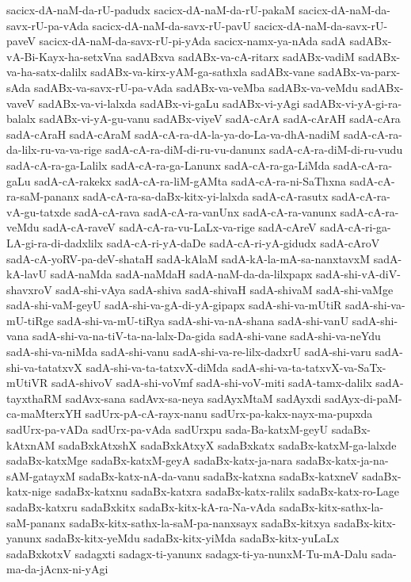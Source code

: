 {sacicx-dA-naM-da-rU-padudx
sacicx-dA-naM-da-rU-pakaM
sacicx-dA-naM-da-savx-rU-pa-vAda
sacicx-dA-naM-da-savx-rU-pavU
sacicx-dA-naM-da-savx-rU-paveV
sacicx-dA-naM-da-savx-rU-pi-yAda
sacicx-namx-ya-nAda
sadA
sadABx-vA-Bi-Kayx-ha-setxVna
sadABxva
sadABx-va-cA-ritarx
sadABx-vadiM
sadABx-va-ha-satx-dalilx
sadABx-va-kirx-yAM-ga-sathxla
sadABx-vane
sadABx-va-parx-sAda
sadABx-va-savx-rU-pa-vAda
sadABx-va-veMba
sadABx-va-veMdu
sadABx-vaveV
sadABx-va-vi-lalxda
sadABx-vi-gaLu
sadABx-vi-yAgi
sadABx-vi-yA-gi-ra-balalx
sadABx-vi-yA-gu-vanu
sadABx-viyeV
sadA-cArA
sadA-cArAH
sadA-cAra
sadA-cAraH
sadA-cAraM
sadA-cA-ra-dA-la-ya-do-La-va-dhA-nadiM
sadA-cA-ra-da-lilx-ru-va-va-rige
sadA-cA-ra-diM-di-ru-vu-danunx
sadA-cA-ra-diM-di-ru-vudu
sadA-cA-ra-ga-Lalilx
sadA-cA-ra-ga-Lanunx
sadA-cA-ra-ga-LiMda
sadA-cA-ra-gaLu
sadA-cA-rakekx
sadA-cA-ra-liM-gAMta
sadA-cA-ra-ni-SaThxna
sadA-cA-ra-saM-pananx
sadA-cA-ra-sa-daBx-kitx-yi-lalxda
sadA-cA-rasutx
sadA-cA-ra-vA-gu-tatxde
sadA-cA-rava
sadA-cA-ra-vanUnx
sadA-cA-ra-vanunx
sadA-cA-ra-veMdu
sadA-cA-raveV
sadA-cA-ra-vu-LaLx-va-rige
sadA-cAreV
sadA-cA-ri-ga-LA-gi-ra-di-dadxlilx
sadA-cA-ri-yA-daDe
sadA-cA-ri-yA-gidudx
sadA-cAroV
sadA-cA-yoRV-pa-deV-shataH
sadA-kAlaM
sadA-kA-la-mA-sa-nanxtavxM
sadA-kA-lavU
sadA-naMda
sadA-naMdaH
sadA-naM-da-da-lilxpapx
sadA-shi-vA-diV-shavxroV
sadA-shi-vAya
sadA-shiva
sadA-shivaH
sadA-shivaM
sadA-shi-vaMge
sadA-shi-vaM-geyU
sadA-shi-va-gA-di-yA-gipapx
sadA-shi-va-mUtiR
sadA-shi-va-mU-tiRge
sadA-shi-va-mU-tiRya
sadA-shi-va-nA-shana
sadA-shi-vanU
sadA-shi-vana
sadA-shi-va-na-tiV-ta-na-lalx-Da-gida
sadA-shi-vane
sadA-shi-va-neYdu
sadA-shi-va-niMda
sadA-shi-vanu
sadA-shi-va-re-lilx-dadxrU
sadA-shi-varu
sadA-shi-va-tatatxvX
sadA-shi-va-ta-tatxvX-diMda
sadA-shi-va-ta-tatxvX-va-SaTx-mUtiVR
sadA-shivoV
sadA-shi-voVmf
sadA-shi-voV-miti
sadA-tamx-dalilx
sadA-tayxthaRM
sadAvx-sana
sadAvx-sa-neya
sadAyxMtaM
sadAyxdi
sadAyx-di-paM-ca-maMterxYH
sadUrx-pA-cA-rayx-nanu
sadUrx-pa-kakx-nayx-ma-pupxda
sadUrx-pa-vADa
sadUrx-pa-vAda
sadUrxpu
sada-Ba-katxM-geyU
sadaBx-kAtxnAM
sadaBxkAtxshX
sadaBxkAtxyX
sadaBxkatx
sadaBx-katxM-ga-lalxde
sadaBx-katxMge
sadaBx-katxM-geyA
sadaBx-katx-ja-nara
sadaBx-katx-ja-na-sAM-gatayxM
sadaBx-katx-nA-da-vanu
sadaBx-katxna
sadaBx-katxneV
sadaBx-katx-nige
sadaBx-katxnu
sadaBx-katxra
sadaBx-katx-ralilx
sadaBx-katx-ro-Lage
sadaBx-katxru
sadaBxkitx
sadaBx-kitx-kA-ra-Na-vAda
sadaBx-kitx-sathx-la-saM-pananx
sadaBx-kitx-sathx-la-saM-pa-nanxsayx
sadaBx-kitxya
sadaBx-kitx-yanunx
sadaBx-kitx-yeMdu
sadaBx-kitx-yiMda
sadaBx-kitx-yuLaLx
sadaBxkotxV
sadagxti
sadagx-ti-yanunx
sadagx-ti-ya-nunxM-Tu-mA-Dalu
sada-ma-da-jAcnx-ni-yAgi
}
